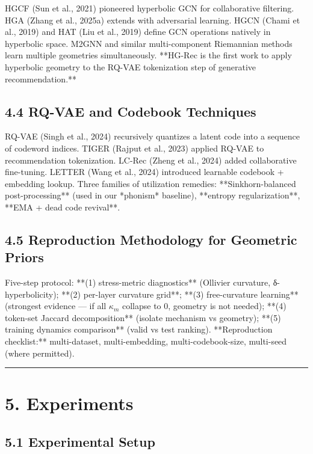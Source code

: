 \documentclass[11pt]{article}
\begin{document}
HGCF (Sun et al., 2021) pioneered hyperbolic GCN for collaborative filtering. HGA (Zhang et al., 2025a) extends with adversarial learning. HGCN (Chami et al., 2019) and HAT (Liu et al., 2019) define GCN operations natively in hyperbolic space. M2GNN and similar multi-component Riemannian methods learn multiple geometries simultaneously. **HG-Rec is the first work to apply hyperbolic geometry to the RQ-VAE tokenization step of generative recommendation.**


\subsection{4.4 RQ-VAE and Codebook Techniques}

RQ-VAE (Singh et al., 2024) recursively quantizes a latent code into a sequence of codeword indices. TIGER (Rajput et al., 2023) applied RQ-VAE to recommendation tokenization. LC-Rec (Zheng et al., 2024) added collaborative fine-tuning. LETTER (Wang et al., 2024) introduced learnable codebook + embedding lookup. Three families of utilization remedies: **Sinkhorn-balanced post-processing** (used in our *phonism* baseline), **entropy regularization**, **EMA + dead code revival**.


\subsection{4.5 Reproduction Methodology for Geometric Priors}

Five-step protocol: **(1) stress-metric diagnostics** (Ollivier curvature, δ-hyperbolicity); **(2) per-layer curvature grid**; **(3) free-curvature learning** (strongest evidence — if all $\kappa_m$ collapse to 0, geometry is not needed); **(4) token-set Jaccard decomposition** (isolate mechanism vs geometry); **(5) training dynamics comparison** (valid vs test ranking). **Reproduction checklist:** multi-dataset, multi-embedding, multi-codebook-size, multi-seed (where permitted).

\noindent\rule{\textwidth}{0.4pt}


\section{5. Experiments}


\subsection{5.1 Experimental Setup}
\end{document}
